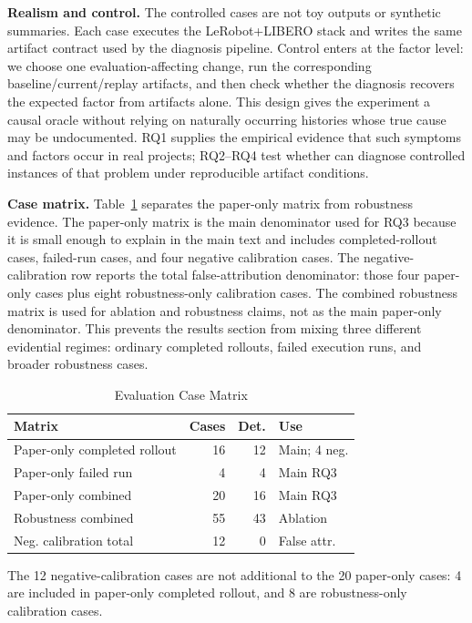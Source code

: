 \noindent\textbf{Realism and control.} The controlled cases are not toy outputs or synthetic summaries. Each case executes the LeRobot+LIBERO stack and writes the same artifact contract used by the diagnosis pipeline. Control enters at the factor level: we choose one evaluation-affecting change, run the corresponding baseline/current/replay artifacts, and then check whether the diagnosis recovers the expected factor from artifacts alone. This design gives the experiment a causal oracle without relying on naturally occurring histories whose true cause may be undocumented. RQ1 supplies the empirical evidence that such symptoms and factors occur in real projects; RQ2--RQ4 test whether \sys can diagnose controlled instances of that problem under reproducible artifact conditions.

\noindent\textbf{Case matrix.} Table~\ref{tab:case-matrix} separates the paper-only matrix from robustness evidence. The paper-only matrix is the main denominator used for RQ3 because it is small enough to explain in the main text and includes completed-rollout cases, failed-run cases, and four negative calibration cases. The negative-calibration row reports the total false-attribution denominator: those four paper-only cases plus eight robustness-only calibration cases. The combined robustness matrix is used for ablation and robustness claims, not as the main paper-only denominator. This prevents the results section from mixing three different evidential regimes: ordinary completed rollouts, failed execution runs, and broader robustness cases.

\begin{table}[!t]
  \caption{Evaluation Case Matrix}
  \label{tab:case-matrix}
  \centering
  \scriptsize
  \renewcommand{\arraystretch}{1.08}
  \begin{tabular}{@{}p{}rrp{}@{}}
    \toprule
    Matrix & Cases & Det. & Use \\
    \midrule
    Paper-only completed rollout & 16 & 12 & Main; 4 neg. \\
    Paper-only failed run & 4 & 4 & Main RQ3 \\
    Paper-only combined & 20 & 16 & Main RQ3 \\
    Robustness combined & 55 & 43 & Ablation \\
    Neg. calibration total & 12 & 0 & False attr. \\
    \bottomrule
  \end{tabular}
  \vspace{1pt}
  \parbox{0.96\columnwidth}{\scriptsize The 12 negative-calibration cases are not additional to the 20 paper-only cases: 4 are included in paper-only completed rollout, and 8 are robustness-only calibration cases.}
\end{table}

